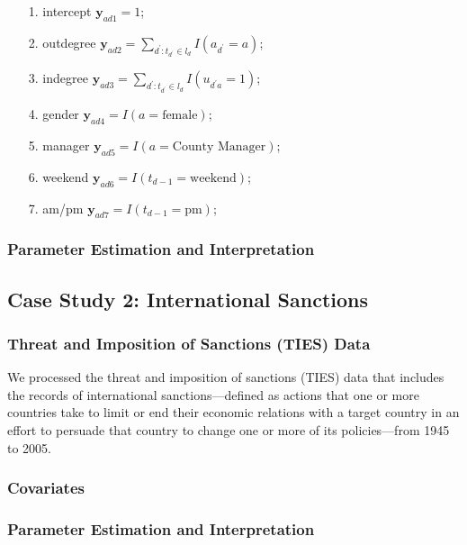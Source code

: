 \documentclass[12pt]{article}
\begin{document}
\begin{itemize}
	\item[1.] intercept $\boldsymbol{y}_{ad1} =1$;
	\item[2.] outdegree $\boldsymbol{y}_{ad2} =\sum\limits_{d^\prime: t_{d^\prime} \in l_d} I(a_{d^\prime} = a)$;
	\item[3.] indegree $\boldsymbol{y}_{ad3}=\sum\limits_{d^\prime: t_{d^\prime} \in l_d} I(u_{d^\prime a} = 1)$;
	\item[4.] gender $\boldsymbol{y}_{ad4}=I(a= \mbox{female})$;
	\item[5.] manager $\boldsymbol{y}_{ad5}=I(a= \mbox{County Manager})$;
	\item[6.] weekend $\boldsymbol{y}_{ad6} = I(t_{d-1}= \mbox{weekend})$;
	\item[7.] am/pm $\boldsymbol{y}_{ad7}= I(t_{d-1}= \mbox{pm})$;
\end{itemize}
\subsubsection{Parameter Estimation and Interpretation}\label{subsubsec:Result_email}
\subsection{Case Study 2: International Sanctions}\label{subsec:International Sanctions}
\subsubsection{Threat and Imposition of Sanctions (TIES) Data}\label{subsubsec:TIES}
We processed the threat and imposition of sanctions (TIES) data \citep{morgan2014threat} that includes the records of international sanctions---defined as actions that one or more countries take to limit or end their economic relations with a target country in an effort to persuade that country to change one or more of its policies---from 1945 to 2005.
\subsubsection{Covariates}\label{subsec:Covariates_sanction}
\subsubsection{Parameter Estimation and Interpretation}\label{subsubsec:Result_sanction}
\end{document}
